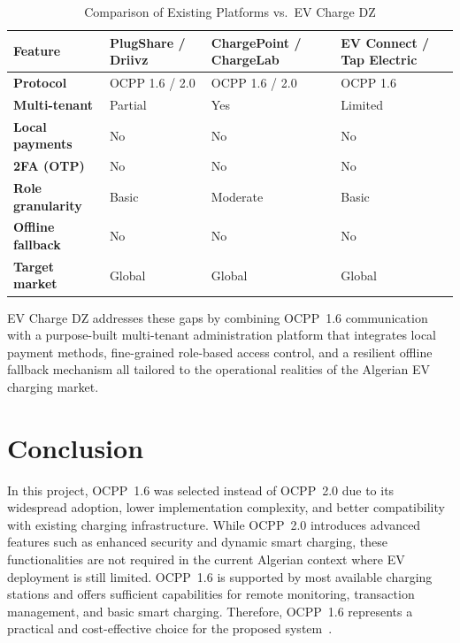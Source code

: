 \documentclass[12pt,a4paper]{report}
\begin{document}
\begin{table}[h!]
  \centering
  \caption{Comparison of Existing Platforms vs.\ EV Charge DZ}
  \label{tab:platform-comparison}
  \renewcommand{\arraystretch}{1.3}
  \begin{tabularx}{\textwidth}{|>{\bfseries}p{3.2cm}|X|X|X|}
    \hline
    Feature
      & PlugShare / Driivz
      & ChargePoint / ChargeLab
      & EV Connect / Tap Electric \\ \hline
    Protocol         & OCPP 1.6 / 2.0  & OCPP 1.6 / 2.0  & OCPP 1.6 \\ \hline
    Multi-tenant     & Partial          & Yes             & Limited  \\ \hline
    Local payments   & No               & No              & No       \\ \hline
    2FA (OTP)        & No               & No              & No       \\ \hline
    Role granularity & Basic            & Moderate        & Basic    \\ \hline
    Offline fallback & No               & No              & No       \\ \hline
    Target market    & Global           & Global          & Global   \\ \hline
  \end{tabularx}
\end{table}

EV Charge DZ addresses these gaps by combining OCPP~1.6 communication with a
purpose-built multi-tenant administration platform that integrates local payment methods,
fine-grained role-based access control, and a resilient offline fallback mechanism
all tailored to the operational realities of the Algerian EV charging market.

\section{Conclusion}

In this project, OCPP~1.6 was selected instead of OCPP~2.0 due to its widespread adoption, lower
implementation complexity, and better compatibility with existing charging infrastructure. While
OCPP~2.0 introduces advanced features such as enhanced security and dynamic smart charging, these
functionalities are not required in the current Algerian context where EV deployment is still
limited. OCPP~1.6 is supported by most available charging stations and offers sufficient
capabilities for remote monitoring, transaction management, and basic smart charging. Therefore,
OCPP~1.6 represents a practical and cost-effective choice for the proposed system~\autocite{ocpp16_ed2}.
\end{document}
